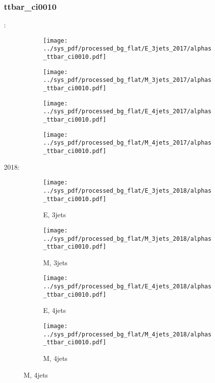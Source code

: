 \documentclass{beamer}
\begin{document}
\begin{frame}
\frametitle{ttbar_ci0010}
\fontsize{5}{1}:
\begin{figure}
\centering
\begin{subfigure}[b]{0.24\textwidth}
\texttt{[image: ../sys\_pdf/processed\_bg\_flat/E\_3jets\_2017/alphas\_ttbar\_ci0010.pdf]}
\end{subfigure}
\begin{subfigure}[b]{0.24\textwidth}
\texttt{[image: ../sys\_pdf/processed\_bg\_flat/M\_3jets\_2017/alphas\_ttbar\_ci0010.pdf]}
\end{subfigure}
\begin{subfigure}[b]{0.24\textwidth}
\texttt{[image: ../sys\_pdf/processed\_bg\_flat/E\_4jets\_2017/alphas\_ttbar\_ci0010.pdf]}
\end{subfigure}
\begin{subfigure}[b]{0.24\textwidth}
\texttt{[image: ../sys\_pdf/processed\_bg\_flat/M\_4jets\_2017/alphas\_ttbar\_ci0010.pdf]}
\end{subfigure}
\end{figure}
2018:
\begin{figure}
\centering
\begin{subfigure}[b]{0.24\textwidth}
\texttt{[image: ../sys\_pdf/processed\_bg\_flat/E\_3jets\_2018/alphas\_ttbar\_ci0010.pdf]}
\captionsetup{font=tiny}
\caption{E, 3jets}
\end{subfigure}
\begin{subfigure}[b]{0.24\textwidth}
\texttt{[image: ../sys\_pdf/processed\_bg\_flat/M\_3jets\_2018/alphas\_ttbar\_ci0010.pdf]}
\captionsetup{font=tiny}
\caption{M, 3jets}
\end{subfigure}
\begin{subfigure}[b]{0.24\textwidth}
\texttt{[image: ../sys\_pdf/processed\_bg\_flat/E\_4jets\_2018/alphas\_ttbar\_ci0010.pdf]}
\captionsetup{font=tiny}
\caption{E, 4jets}
\end{subfigure}
\begin{subfigure}[b]{0.24\textwidth}
\texttt{[image: ../sys\_pdf/processed\_bg\_flat/M\_4jets\_2018/alphas\_ttbar\_ci0010.pdf]}
\captionsetup{font=tiny}
\caption{M, 4jets}
\end{subfigure}
\end{figure}
\end{frame}
\end{document}
